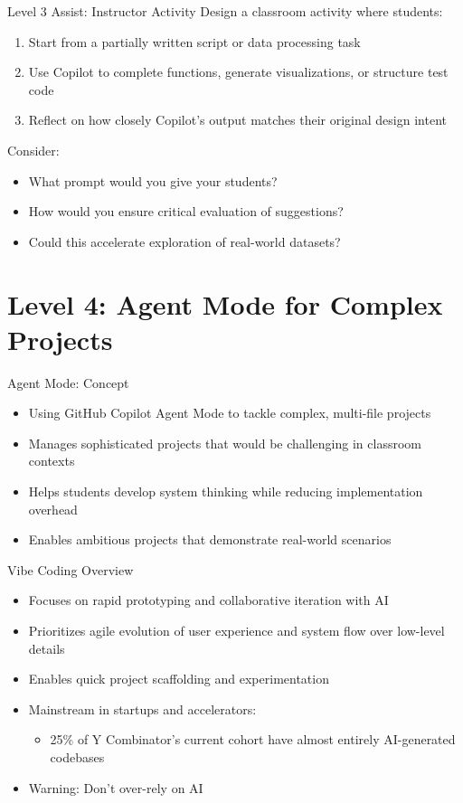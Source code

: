 \documentclass[xcolor=dvipsnames, aspectratio=169]{beamer}
\begin{document}
\begin{frame}{Level 3 Assist: Instructor Activity}
  Design a classroom activity where students:
  \begin{enumerate}
    \item Start from a partially written script or data processing task
    \item Use Copilot to complete functions, generate visualizations, or structure test code
    \item Reflect on how closely Copilot's output matches their original design intent
  \end{enumerate}
  
  Consider:
  \begin{itemize}
    \item What prompt would you give your students?
    \item How would you ensure critical evaluation of suggestions?
    \item Could this accelerate exploration of real-world datasets?
  \end{itemize}
\end{frame}

\section{Level 4: Agent Mode for Complex Projects}

\begin{frame}{Agent Mode: Concept}
  \begin{itemize}
    \item Using GitHub Copilot Agent Mode to tackle complex, multi-file projects
    \item Manages sophisticated projects that would be challenging in classroom contexts
    \item Helps students develop system thinking while reducing implementation overhead
    \item Enables ambitious projects that demonstrate real-world scenarios
  \end{itemize}
\end{frame}

\begin{frame}{Vibe Coding Overview}
  \begin{itemize}
    \item Focuses on rapid prototyping and collaborative iteration with AI
    \item Prioritizes agile evolution of user experience and system flow over low-level details
    \item Enables quick project scaffolding and experimentation
    \item Mainstream in startups and accelerators:
      \begin{itemize}
        \item 25\% of Y Combinator's current cohort have almost entirely AI-generated codebases
      \end{itemize}
    \item Warning: Don't over-rely on AI
  \end{itemize}
\end{frame}
\end{document}

